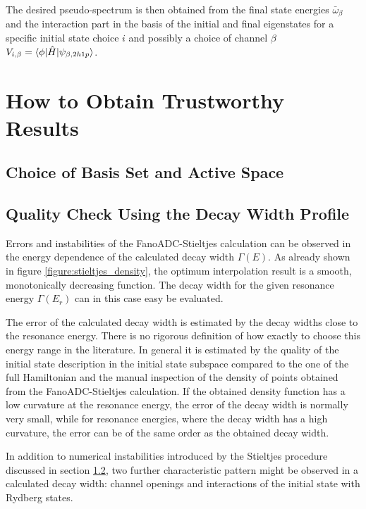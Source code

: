 \begin{figure}[h]
  \centering
  
  \caption{}
  \label{figure:fano_bastrans}
\end{figure}
The desired pseudo-spectrum is then obtained from the final state energies
$\bar{\omega}_\beta$ and the interaction part in the basis of the initial and
final eigenstates for a specific initial state choice $i$ and possibly a choice
of channel $\beta$
$V_{i,\beta} = \braket{\phi |\hat{H}| \psi_{\beta, 2h1p}}$.




\section{How to Obtain Trustworthy Results}
\subsection{Choice of Basis Set and Active Space}
\subsection{Quality Check Using the Decay Width Profile}
Errors and instabilities of the FanoADC-Stieltjes calculation can be observed
in the energy dependence of the calculated decay width $\Gamma(E)$.
As already shown in figure \ref{figure:stieltjes_density}, the optimum
interpolation result is a smooth, monotonically decreasing function.
The decay width for the given resonance energy $\Gamma(E_r)$ can in this case easy be
evaluated.

The error of the calculated decay width is estimated by the decay widths
close to the resonance energy.
There is no rigorous definition
of how exactly to choose this energy range in the literature. 
In general it is estimated
by the quality of the initial state description in the initial
state subspace compared to the one of the full Hamiltonian and the
manual inspection of the density of points obtained
from the FanoADC-Stieltjes calculation. If
the obtained density function has a low curvature at the resonance energy,
the error of the decay width is normally very small, while for resonance
energies, where the decay width has a high curvature, the error can be of the same
order as the obtained decay width.

In addition to numerical instabilities introduced by the Stieltjes procedure
discussed in section \ref{},
two further characteristic pattern might be observed in a calculated
decay width: channel openings and interactions of the initial state
with Rydberg states.


